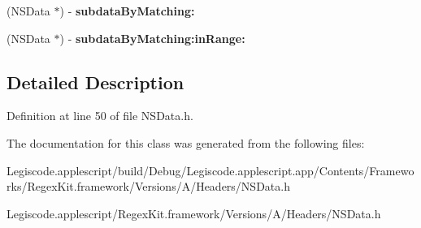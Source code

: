 \begin{DoxyCompactItemize}
\item 
\hypertarget{interface_n_s_data_07_regex_kit_additions_08_acb6b0049863f670669e1fd604932c0a6}{(N\-S\-Data $\ast$) -\/ {\bfseries subdata\-By\-Matching\-:}}\label{interface_n_s_data_07_regex_kit_additions_08_acb6b0049863f670669e1fd604932c0a6}

\item 
\hypertarget{interface_n_s_data_07_regex_kit_additions_08_ad48af4d0814356cbe42d22b3c6782628}{(N\-S\-Data $\ast$) -\/ {\bfseries subdata\-By\-Matching\-:in\-Range\-:}}\label{interface_n_s_data_07_regex_kit_additions_08_ad48af4d0814356cbe42d22b3c6782628}

\end{DoxyCompactItemize}


\subsection{Detailed Description}


Definition at line 50 of file N\-S\-Data.\-h.



The documentation for this class was generated from the following files\-:\begin{DoxyCompactItemize}
\item 
Legiscode.\-applescript/build/\-Debug/\-Legiscode.\-applescript.\-app/\-Contents/\-Frameworks/\-Regex\-Kit.\-framework/\-Versions/\-A/\-Headers/N\-S\-Data.\-h\item 
Legiscode.\-applescript/\-Regex\-Kit.\-framework/\-Versions/\-A/\-Headers/N\-S\-Data.\-h\end{DoxyCompactItemize}
